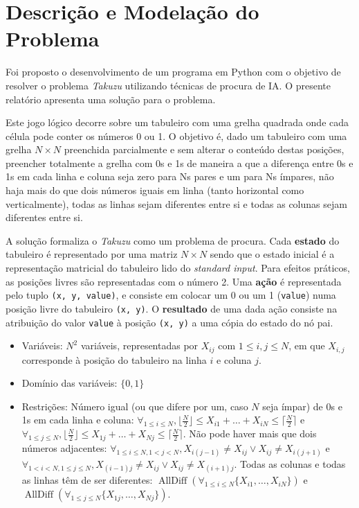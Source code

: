 \documentclass[12pt,a4paper]{article}
\newcommand{\op}{\operatorname}
\begin{document}
\section{Descrição e Modelação do Problema}

Foi proposto o desenvolvimento de um programa em Python com o objetivo de resolver o
problema \textit{Takuzu} utilizando técnicas de procura de IA.
O presente relatório apresenta uma solução para o problema.

Este jogo lógico decorre sobre um tabuleiro com uma grelha quadrada onde cada célula
pode conter os números 0 ou 1.
O objetivo é, dado um tabuleiro com uma grelha \(N \times N\) preenchida parcialmente e
sem alterar o conteúdo destas posições, preencher totalmente a grelha com 0s e 1s de maneira
a que a diferença entre 0s e 1s em cada linha e coluna seja zero para Ns pares e um para Ns ímpares,
não haja mais do que dois números iguais em linha (tanto horizontal como verticalmente),
todas as linhas sejam diferentes entre si e todas as colunas sejam diferentes entre si.

A solução formaliza o \textit{Takuzu} como um problema de procura.
Cada \textbf{estado} do tabuleiro é representado por uma matriz \(N \times N\) sendo que o estado inicial
é a representação matricial do tabuleiro lido do \textit{standard input}.
Para efeitos práticos, as posições livres são representadas com o número 2.
Uma \textbf{ação} é representada pelo tuplo \texttt{(x, y, value)}, e consiste em colocar um 0 ou um 1 (\texttt{value})
numa posição livre do tabuleiro \texttt{(x, y)}. O \textbf{resultado} de uma dada ação consiste na
atribuição do valor \texttt{value} à posição \texttt{(x, y)} a uma cópia do estado do nó pai.

\begin{itemize}
  \setlength\itemsep{0em}
  \item Variáveis: \(N^2\) variáveis, representadas por \(X_{ij}\) com \(1 \leq i,j \leq N\), em que \(X_{i,j}\)
        corresponde à posição do tabuleiro na linha \(i\) e coluna \(j\).
  \item Domínio das variáveis: \(\{0, 1\}\)
  \item Restrições: Número igual (ou que difere por um, caso \(N\) seja ímpar) de 0s e 1s em cada linha e coluna:
        \(\forall_{1\leq i \leq N}, \lfloor \frac{N}{2} \rfloor \leq X_{i1} + \dots + X_{iN} \leq \lceil \frac{N}{2} \rceil\)
        e
        \(\forall_{1\leq j \leq N}, \lfloor \frac{N}{2} \rfloor \leq X_{1j} + \dots + X_{Nj} \leq \lceil \frac{N}{2} \rceil\).
        Não pode haver mais que dois números adjacentes:
        \(\forall_{1\leq i \leq N, 1 < j < N}, X_{i(j-1)} \ne X_{ij} \lor X_{ij} \ne X_{i(j+1)}\)
        e
        \(\forall_{1 < i < N, 1\leq j \leq N}, X_{(i-1)j} \ne X_{ij} \lor X_{ij} \ne X_{(i+1)j}\).
        Todas as colunas e todas as linhas têm de ser diferentes:
        \(\op{AllDiff}(\forall_{1\leq i \leq N} \{X_{i1}, \dots, X_{iN}\}) \)
        e
        \(\op{AllDiff}(\forall_{1\leq j \leq N} \{X_{1j}, \dots, X_{Nj}\}) \).
\end{itemize}
\end{document}
